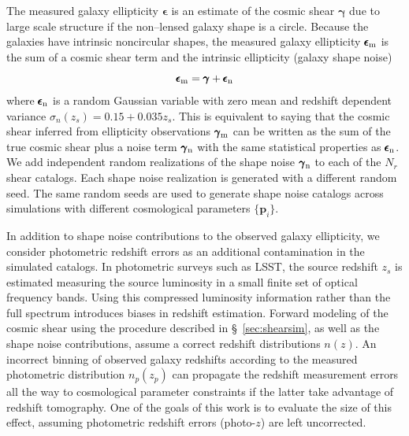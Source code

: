 \documentclass[reprint,aps,prd,superscriptaddress,showkeys,showpacs]{revtex4-1}
\newcommand{\bb}[1]{\mathbf{#1}}
\begin{document}
The measured galaxy ellipticity $\pmb{\epsilon}$ is an estimate of the cosmic shear $\pmb{\gamma}$ due to large scale structure if the non--lensed galaxy shape is a circle. Because the galaxies have intrinsic noncircular shapes, the measured galaxy ellipticity $\pmb{\epsilon}_{\rm m}$ is the sum of a cosmic shear term and the intrinsic ellipticity (galaxy shape noise) \citep{wlreview}
\begin{equation}
\pmb{\epsilon}_{\rm m} = \pmb{\gamma} + \pmb{\epsilon}_{\rm n}
\end{equation} 
%
where $\pmb{\epsilon}_{\rm n}$ is a random Gaussian variable with zero mean and redshift dependent variance $\sigma_n(z_s)=0.15+0.035z_s$. This is equivalent to saying that the cosmic shear inferred from ellipticity observations $\pmb{\gamma}_{\rm m}$ can be written as the sum of the true cosmic shear plus a noise term $\pmb{\gamma}_{\rm n}$ with the same statistical properties as $\pmb{\epsilon}_{\rm n}$. 
We add independent random realizations of the shape noise $\pmb{\gamma}_{\rm n}$ to each of the $N_r$ shear catalogs. Each shape noise realization is generated with a different random seed. The same random seeds are used to generate shape noise catalogs across simulations with different cosmological parameters $\{\bb{p}_i\}$.

In addition to shape noise contributions to the observed galaxy ellipticity, we consider photometric redshift errors as an additional contamination in the simulated catalogs. In photometric surveys such as LSST, the source redshift $z_s$ is estimated measuring the source luminosity in a small finite set of optical frequency bands. Using this compressed luminosity information rather than the full spectrum introduces biases in redshift estimation. Forward modeling of the cosmic shear using the procedure described in \S~\ref{sec:shearsim}, as well as the shape noise contributions, assume a correct redshift distributions $n(z)$. An incorrect binning of observed galaxy redshifts according to the measured photometric distribution $n_p(z_p)$ can propagate the redshift measurement errors all the way to cosmological parameter constraints if the latter take advantage of redshift tomography. One of the goals of this work is to evaluate the size of this effect, assuming photometric redshift errors (photo-$z$) are left uncorrected. 
\end{document}
